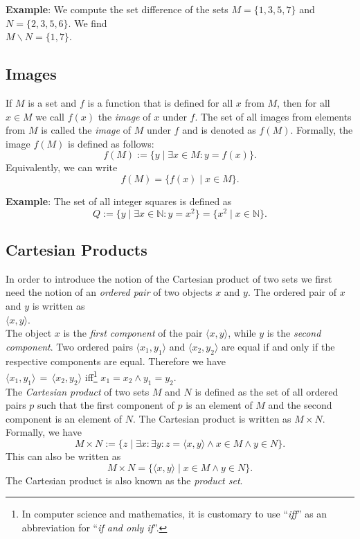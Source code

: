 \noindent
\textbf{Example}: 
We compute the set difference of the sets $M = \{ 1, 3, 5, 7 \}$ and $N = \{ 2, 3, 5, 6
\}$.  We find
\\[0.2cm]
\hspace*{1.3cm} $M \backslash N = \{ 1, 7 \}$.

\subsection{Images}
If  $M$ is a set and $f$ is a function that is defined for all $x$ from $M$, then for all
$x \in M$ we call $f(x)$ the \emph{image} of $x$ under $f$.  The set of all images
from elements from $M$ is called the \emph{image} of $M$ under $f$ and is denoted as $f(M)$.
Formally, the image $f(M)$ is defined as follows:
 \[ f(M) := \{ y \;|\; \exists x \in M: y = f(x) \}. \]
Equivalently, we can write 
\[ f(M) = \bigl\{ f(x) \;|\; x \in M \}. \]
\vspace{0.2cm}

\noindent
\textbf{Example}: 
The set of all integer squares is defined as 
\[ Q := \bigl\{ y \mid \exists x \in \mathbb{N}: y = x^2 \bigr\} = 
        \bigl\{ x^2 \mid x \in \mathbb{N} \bigr\}. 
\]


\subsection{Cartesian Products}
In order to introduce the notion of the Cartesian product of two sets we first need the
notion of an \emph{ordered pair} of two objects $x$ and $y$.  The ordered pair of $x$
and $y$ is written as  
\\[0.2cm]
\hspace*{1.3cm} $\langle x, y \rangle$.
\\[0.2cm]
The object $x$ is the \emph{first component} of the pair $\langle x, y \rangle$, 
while $y$ is the  \emph{second component}.  Two ordered pairs $\langle x_1, y_1 \rangle$ and $\langle x_2, y_2 \rangle$
are equal if and only if the respective components are equal.  Therefore we have 
\\[0.2cm]
\hspace*{1.3cm} 
$\langle x_1, y_1 \rangle \,=\,\langle x_2, y_2 \rangle$ 
\quad iff\footnote{
In computer science and mathematics, 
it is customary to use ``\emph{iff}'' as an abbreviation for ``\emph{if and only if}''.
} \quad
$x_1 = x_2 \wedge y_1 = y_2$.
 \\[0.2cm]
The \emph{Cartesian product} of two sets $M$ and $N$ is defined as the set of all ordered
pairs $p$ such that the first component of $p$ is an element of $M$ and the second
component is an element of $N$.  The Cartesian product is written as $M \times N$.
Formally, we have 
\[ M \times N := \big\{ z \mid \exists x\colon \exists y\colon z = \langle x,y\rangle \wedge x\in M \wedge y \in N \}. \]
This can also be written as 
\[ M \times N = \big\{ \langle x,y\rangle \mid  x\in M \wedge y \in N \}. \]
The Cartesian product is also known as the \emph{product set}.
\vspace{0.2cm}

